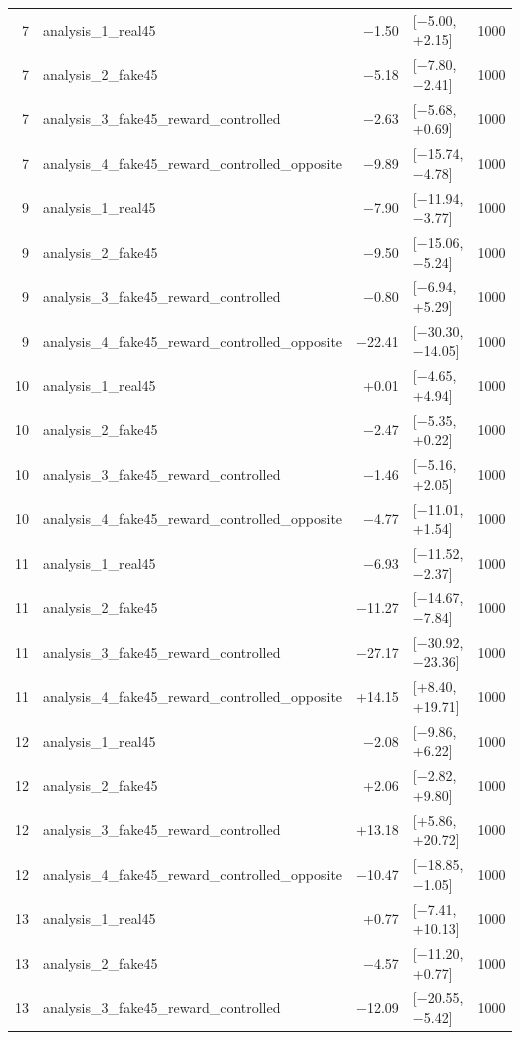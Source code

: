 \begin{table}[htbp]
\begin{tabular}{rlrlr}
    7 & analysis\_1\_real45 & −1.50 & [−5.00, +2.15] & 1000 \\
    7 & analysis\_2\_fake45 & −5.18 & [−7.80, −2.41] & 1000 \\
    7 & analysis\_3\_fake45\_reward\_controlled & −2.63 & [−5.68, +0.69] & 1000 \\
    7 & analysis\_4\_fake45\_reward\_controlled\_opposite & −9.89 & [−15.74, −4.78] & 1000 \\
    9 & analysis\_1\_real45 & −7.90 & [−11.94, −3.77] & 1000 \\
    9 & analysis\_2\_fake45 & −9.50 & [−15.06, −5.24] & 1000 \\
    9 & analysis\_3\_fake45\_reward\_controlled & −0.80 & [−6.94, +5.29] & 1000 \\
    9 & analysis\_4\_fake45\_reward\_controlled\_opposite & −22.41 & [−30.30, −14.05] & 1000 \\
    10 & analysis\_1\_real45 & +0.01 & [−4.65, +4.94] & 1000 \\
    10 & analysis\_2\_fake45 & −2.47 & [−5.35, +0.22] & 1000 \\
    10 & analysis\_3\_fake45\_reward\_controlled & −1.46 & [−5.16, +2.05] & 1000 \\
    10 & analysis\_4\_fake45\_reward\_controlled\_opposite & −4.77 & [−11.01, +1.54] & 1000 \\
    11 & analysis\_1\_real45 & −6.93 & [−11.52, −2.37] & 1000 \\
    11 & analysis\_2\_fake45 & −11.27 & [−14.67, −7.84] & 1000 \\
    11 & analysis\_3\_fake45\_reward\_controlled & −27.17 & [−30.92, −23.36] & 1000 \\
    11 & analysis\_4\_fake45\_reward\_controlled\_opposite & +14.15 & [+8.40, +19.71] & 1000 \\
    12 & analysis\_1\_real45 & −2.08 & [−9.86, +6.22] & 1000 \\
    12 & analysis\_2\_fake45 & +2.06 & [−2.82, +9.80] & 1000 \\
    12 & analysis\_3\_fake45\_reward\_controlled & +13.18 & [+5.86, +20.72] & 1000 \\
    12 & analysis\_4\_fake45\_reward\_controlled\_opposite & −10.47 & [−18.85, −1.05] & 1000 \\
    13 & analysis\_1\_real45 & +0.77 & [−7.41, +10.13] & 1000 \\
    13 & analysis\_2\_fake45 & −4.57 & [−11.20, +0.77] & 1000 \\
    13 & analysis\_3\_fake45\_reward\_controlled & −12.09 & [−20.55, −5.42] & 1000 \\

\end{tabular}
\end{table}
